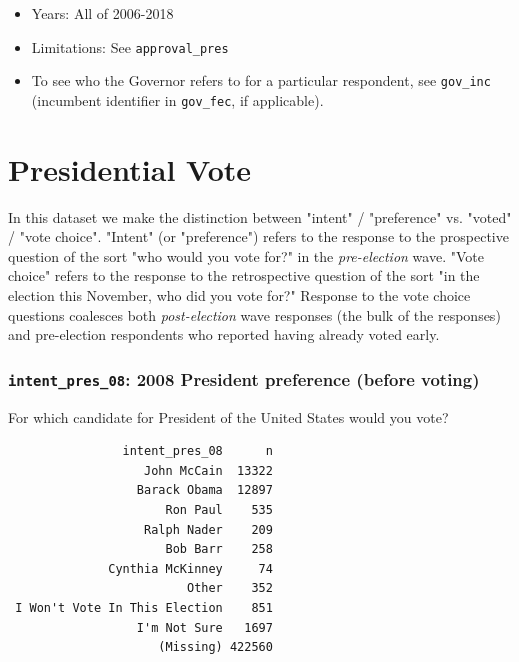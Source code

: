 \documentclass[10pt,article,oneside]{memoir}
\theoremstyle{definition}
\begin{document}
\begin{itemize}
\tightlist
\item
  Years: All of 2006-2018
\item
  Limitations: See \texttt{approval\_pres}
\item
  To see who the Governor refers to for a particular respondent, see
  \texttt{gov\_inc} (incumbent identifier in \texttt{gov\_fec}, if
  applicable).
\end{itemize}

\newpage

\section{Presidential Vote}\label{presidential-vote}

\begin{tcolorbox}[title={A note on \texttt{intent} and \texttt{voted}}]
In this dataset we make the distinction between "intent" / "preference" vs. "voted" / "vote choice". "Intent" (or "preference") refers to the response to the prospective question of the sort "who would you vote for?" in the \emph{pre-election} wave. "Vote choice" refers to the response to the retrospective question of the sort "in the election this November, who did you vote for?" Response to the vote choice questions coalesces both \emph{post-election} wave responses (the bulk of the responses) and pre-election respondents who reported having already voted early. 
\end{tcolorbox}

\subsubsection{\texorpdfstring{\texttt{intent\_pres\_08}: 2008 President
preference (before
voting)}{intent\_pres\_08: 2008 President preference (before voting)}}\label{intent_pres_08-2008-president-preference-before-voting}

For which candidate for President of the United States would you vote?

\begin{verbatim}
                intent_pres_08      n
                   John McCain  13322
                  Barack Obama  12897
                      Ron Paul    535
                   Ralph Nader    209
                      Bob Barr    258
              Cynthia McKinney     74
                         Other    352
 I Won't Vote In This Election    851
                  I'm Not Sure   1697
                     (Missing) 422560
\end{verbatim}
\end{document}
